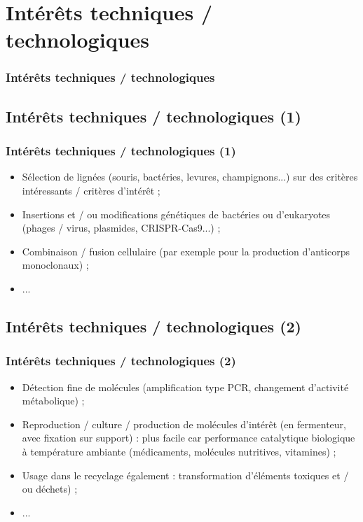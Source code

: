 \documentclass{beamer}
\begin{document}

\section{Int{\'e}r{\^e}ts techniques / technologiques }
\begin{frame}
	\frametitle{Int{\'e}r{\^e}ts techniques / technologiques }
	\tableofcontents[sections=6,currentsection,subsectionstyle=show/shaded/hide]
\end{frame} 

\subsection{ Int{\'e}r{\^e}ts techniques / technologiques (1)  }
\begin{frame}
	\frametitle{ Int{\'e}r{\^e}ts techniques / technologiques (1) }
	\begin{itemize}
		\item S{\'e}lection de lign{\'e}es (souris, bact{\'e}ries, levures, champignons...) sur des crit{\`e}res int{\'e}ressants / crit{\`e}res d'int{\'e}r{\^e}t ; 
		\item Insertions et / ou modifications g{\'e}n{\'e}tiques de bact{\'e}ries ou d'eukaryotes (phages / virus, plasmides, CRISPR-Cas9...) ; 
		\item Combinaison / fusion cellulaire (par exemple pour la production d'anticorps monoclonaux) ; 
		\item ... 
	\end{itemize}
\end{frame}

\subsection{ Int{\'e}r{\^e}ts techniques / technologiques (2) }
\begin{frame}
	\frametitle{ Int{\'e}r{\^e}ts techniques / technologiques (2) }
	\begin{itemize}
		\item D{\'e}tection fine de mol{\'e}cules (amplification type PCR, changement d'activit{\'e} m{\'e}tabolique) ; 
		\item Reproduction / culture / production de mol{\'e}cules d'int{\'e}r{\^e}t (en fermenteur, avec fixation sur support) : plus facile car performance catalytique biologique {\`a} temp{\'e}rature ambiante (m{\'e}dicaments, mol{\'e}cules nutritives, vitamines) ;  
		\item Usage dans le recyclage {\'e}galement : transformation d'{\'e}l{\'e}ments toxiques et / ou d{\'e}chets) ;
		\item ... 
	\end{itemize}
\end{frame}
\end{document}
